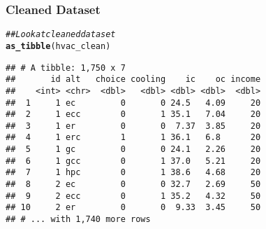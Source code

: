 \documentclass{beamer}\usepackage[]{graphicx}\usepackage[]{color}
\makeatletter
\newcommand{\hlnum}[1]{\textcolor[rgb]{0.686,0.059,0.569}{#1}}%
\newcommand{\hlcom}[1]{\textcolor[rgb]{0.678,0.584,0.686}{\textit{#1}}}%
\newcommand{\hlopt}[1]{\textcolor[rgb]{0,0,0}{#1}}%
\newcommand{\hlstd}[1]{\textcolor[rgb]{0.345,0.345,0.345}{#1}}%
\newcommand{\hlkwb}[1]{\textcolor[rgb]{0.69,0.353,0.396}{#1}}%
\newcommand{\hlkwc}[1]{\textcolor[rgb]{0.333,0.667,0.333}{#1}}%
\newcommand{\hlkwd}[1]{\textcolor[rgb]{0.737,0.353,0.396}{\textbf{#1}}}%
\newenvironment{kframe}{%
 \def\at@end@of@kframe{}%
 \ifinner\ifhmode%
  \def\at@end@of@kframe{\end{minipage}}%
  \begin{minipage}{\columnwidth}%
 \fi\fi%
 \def\FrameCommand##1{\hskip\@totalleftmargin \hskip-\fboxsep
 \colorbox{shadecolor}{##1}\hskip-\fboxsep
     \hskip-\linewidth \hskip-\@totalleftmargin \hskip\columnwidth}%
 \MakeFramed {\advance\hsize-\width
   \@totalleftmargin\z@ \linewidth\hsize
   \@setminipage}}%
 {\par\unskip\endMakeFramed%
 \at@end@of@kframe}
\newenvironment{knitrout}{}{} %
\makeatother
\begin{document}

\begin{frame}[fragile]\frametitle{Cleaned Dataset}
\begin{knitrout}\footnotesize
{}\color{fgcolor}\begin{kframe}
\begin{alltt}
\hlcom{## Look at cleaned dataset}
\hlkwd{as_tibble}\hlstd{(hvac_clean)}
\end{alltt}
\begin{verbatim}
## # A tibble: 1,750 x 7
##       id alt   choice cooling    ic    oc income
##    <int> <chr>  <dbl>   <dbl> <dbl> <dbl>  <dbl>
##  1     1 ec         0       0 24.5   4.09     20
##  2     1 ecc        0       1 35.1   7.04     20
##  3     1 er         0       0  7.37  3.85     20
##  4     1 erc        1       1 36.1   6.8      20
##  5     1 gc         0       0 24.1   2.26     20
##  6     1 gcc        0       1 37.0   5.21     20
##  7     1 hpc        0       1 38.6   4.68     20
##  8     2 ec         0       0 32.7   2.69     50
##  9     2 ecc        0       1 35.2   4.32     50
## 10     2 er         0       0  9.33  3.45     50
## # ... with 1,740 more rows
\end{verbatim}
\end{kframe}
\end{knitrout}
\end{frame}
\end{document}
